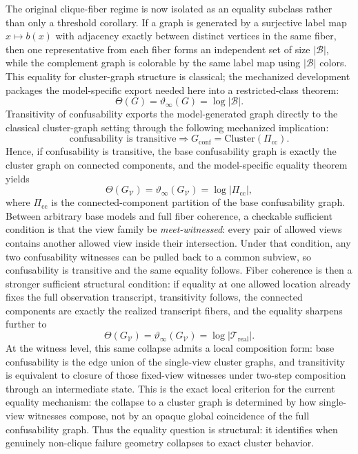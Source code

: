 The original clique-fiber regime is now isolated as an equality subclass rather than only a threshold corollary. If a graph is generated by a surjective label map $x \mapsto b(x)$ with adjacency exactly between distinct vertices in the same fiber, then one representative from each fiber forms an independent set of size $|\mathcal B|$, while the complement graph is colorable by the same label map using $|\mathcal B|$ colors. This equality for cluster-graph structure is classical; the mechanized development packages the model-specific export needed here into a restricted-class theorem:
\[
\Theta(G)=\vartheta_{\infty}(G)=\log |\mathcal B|.
\]
Transitivity of confusability exports the model-generated graph directly to the classical cluster-graph setting through the following mechanized implication:
\[
\text{confusability is transitive}
\Longrightarrow
G_{\mathrm{conf}}=\mathrm{Cluster}(\Pi_{\mathrm{cc}}).
\]
Hence, if confusability is transitive, the base confusability graph is exactly the cluster graph on connected components, and the model-specific equality theorem yields
\[
\Theta(G_{\mathcal V})=\vartheta_\infty(G_{\mathcal V})=\log |\Pi_{\mathrm{cc}}|,
\]
where $\Pi_{\mathrm{cc}}$ is the connected-component partition of the base confusability graph. Between arbitrary base models and full fiber coherence, a checkable sufficient condition is that the view family be \emph{meet-witnessed}: every pair of allowed views contains another allowed view inside their intersection. Under that condition, any two confusability witnesses can be pulled back to a common subview, so confusability is transitive and the same equality follows. Fiber coherence is then a stronger sufficient structural condition: if equality at one allowed location already fixes the full observation transcript, transitivity follows, the connected components are exactly the realized transcript fibers, and the equality sharpens further to
\[
\Theta(G_{\mathcal V})=\vartheta_\infty(G_{\mathcal V})=\log |\mathcal T_{\mathrm{real}}|.
\]
At the witness level, this same collapse admits a local composition form: base confusability is the edge union of the single-view cluster graphs, and transitivity is equivalent to closure of those fixed-view witnesses under two-step composition through an intermediate state. This is the exact local criterion for the current equality mechanism: the collapse to a cluster graph is determined by how single-view witnesses compose, not by an opaque global coincidence of the full confusability graph. Thus the equality question is structural: it identifies when genuinely non-clique failure geometry collapses to exact cluster behavior.

